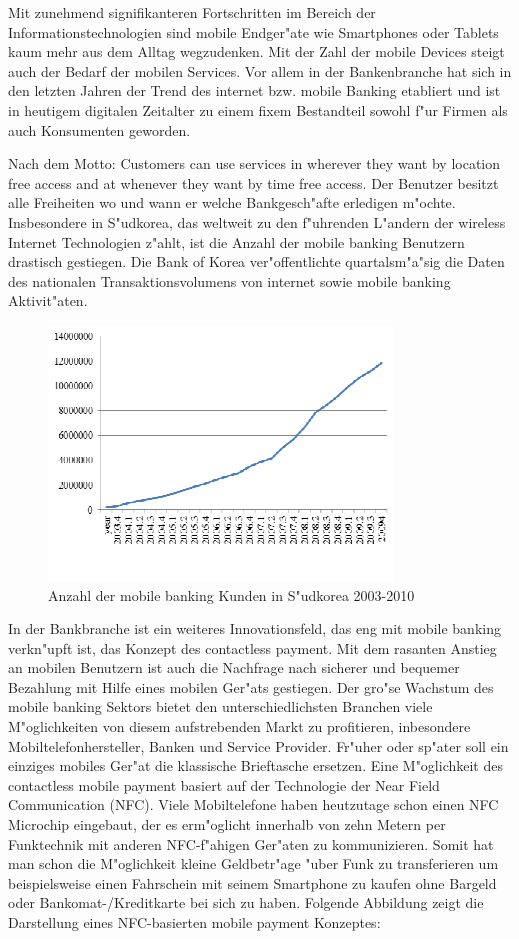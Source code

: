 Mit zunehmend signifikanteren Fortschritten im Bereich der Informationstechnologien sind mobile Endger"ate wie Smartphones oder Tablets kaum mehr aus dem Alltag wegzudenken. Mit der Zahl der mobile Devices steigt auch der Bedarf der mobilen Services. Vor allem in der Bankenbranche hat sich in den letzten Jahren der Trend des internet bzw. mobile Banking etabliert und ist in heutigem digitalen Zeitalter zu einem fixem Bestandteil sowohl f"ur Firmen als auch Konsumenten geworden. 

Nach dem Motto: \glqq Customers can use services in wherever they want by location free access and at whenever they want by time free access. \grqq Der Benutzer besitzt alle Freiheiten wo und wann er welche Bankgesch"afte erledigen m"ochte. Insbesondere in S"udkorea, das weltweit zu den f"uhrenden L"andern der wireless Internet Technologien z"ahlt, ist die Anzahl der mobile banking Benutzern drastisch gestiegen. Die Bank of Korea ver"offentlichte quartalsm"a"sig die Daten des nationalen Transaktionsvolumens von internet sowie mobile banking Aktivit"aten.\cite{Jung2011}

\begin{figure}[h!]
	\caption{Anzahl der mobile banking Kunden in S"udkorea 2003-2010}
	\centering
		\includegraphics[scale=1.2]{figures/Jung2011}
\end{figure}

In der Bankbranche ist ein weiteres Innovationsfeld, das eng mit mobile banking verkn"upft ist, das Konzept des contactless payment. Mit dem rasanten Anstieg an mobilen Benutzern ist auch die Nachfrage nach sicherer und bequemer Bezahlung mit Hilfe eines mobilen Ger"ats gestiegen. Der gro"se Wachstum des mobile banking Sektors bietet den unterschiedlichsten Branchen viele M"oglichkeiten von diesem aufstrebenden Markt zu profitieren, inbesondere Mobiltelefonhersteller, Banken und Service Provider. Fr"uher oder sp"ater soll ein einziges mobiles Ger"at die klassische Brieftasche ersetzen. Eine M"oglichkeit des contactless mobile payment basiert auf der Technologie der Near Field Communication (NFC). Viele Mobiltelefone haben heutzutage schon einen NFC Microchip eingebaut, der es erm"oglicht innerhalb von zehn Metern per Funktechnik mit anderen NFC-f"ahigen Ger"aten zu kommunizieren. Somit hat man schon die M"oglichkeit kleine Geldbetr"age "uber Funk zu transferieren um beispielsweise einen Fahrschein mit seinem Smartphone zu kaufen ohne Bargeld oder Bankomat-/Kreditkarte bei sich zu haben. Folgende Abbildung zeigt die Darstellung eines NFC-basierten mobile payment Konzeptes\cite{Kadambi2009}:

